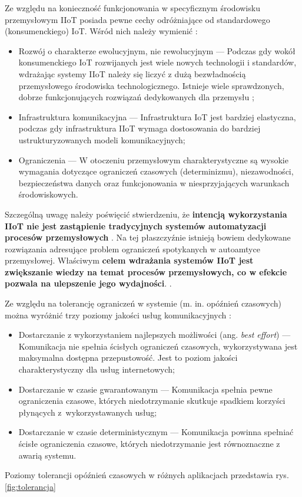 \documentclass[a4paper, 12pt, twoside]{article}
\begin{document}
Ze względu na konieczność funkcjonowania w specyficznym środowisku przemysłowym
IIoT posiada pewne cechy odróżniające od standardowego (konsumenckiego) IoT.
Wśród nich należy wymienić \cite{iiot-challenges-opportunities-directions}:
\begin{itemize}
    \itemsep0em 
    \item Rozwój o charakterze ewolucyjnym, nie rewolucyjnym
    --- Podczas gdy wokół konsumenckiego IoT rozwijanych jest wiele nowych technologii i standardów, 
    wdrażając systemy IIoT należy się liczyć z dużą bezwładnością
    przemysłowego środowiska technologicznego. Istnieje wiele sprawdzonych, dobrze
    funkcjonujących rozwiązań dedykowanych dla przemysłu \cite{isp};
    \item Infrastruktura komunikacyjna 
    --- Infrastruktura IoT jest bardziej elastyczna, podczas gdy infrastruktura
    IIoT wymaga dostosowania do bardziej ustrukturyzowanych modeli komunikacyjnych;
    \item Ograniczenia
    --- W otoczeniu przemysłowym charakterystyczne są wysokie wymagania dotyczące
    ograniczeń czasowych (determinizmu), niezawodności, bezpieczeństwa danych oraz
    funkcjonowania w niesprzyjających warunkach środowiskowych.
\end{itemize}

Szczególną uwagę należy poświęcić stwierdzeniu, że \textbf{intencją wykorzystania IIoT nie 
jest zastąpienie tradycyjnych systemów automatyzacji procesów przemysłowych} \cite{iiot-challenges-opportunities-directions}. 
Na tej płaszczyźnie istnieją bowiem dedykowane rozwiązania adresujące
problem ograniczeń spotykanych w autoamtyce przemysłowej.
Właściwym \textbf{celem wdrażania systemów IIoT jest zwiększanie wiedzy na temat procesów
przemysłowych, co w efekcie pozwala na ulepszenie jego wydajności}.
\cite{iiot-challenges-opportunities-directions}. 

Ze względu na tolerancję ograniczeń w systemie (m. in. opóźnień czasowych) można 
wyróżnić trzy poziomy jakości usług komunikacyjnych \cite{iot-hype-to-reality}: 
\begin{itemize}
    \itemsep0em 
    \item Dostarczanie z wykorzystaniem najlepszych możliwości (ang. \emph{best effort})
    --- Komunikacja nie spełnia ścisłych ograniczeń czasowych, wykorzystywana jest 
    maksymalna dostępna przepustowość. Jest to poziom jakości charakterystyczny
    dla usług internetowych;
    \item Dostarczanie w czasie gwarantowanym
    --- Komunikacja spełnia pewne ograniczenia czasowe, których niedotrzymanie
    skutkuje spadkiem korzyści płynących z~wykorzystawanych usług;
    \item Dostarczanie w czasie deterministycznym
    --- Komunikacja powinna spełniać ścisłe ograniczenia czasowe,
    których niedotrzymanie jest równoznaczne z awarią systemu.
\end{itemize}
Poziomy tolerancji opóźnień czasowych w różnych aplikacjach przedstawia rys. \ref{fig:tolerancja}
\end{document}
